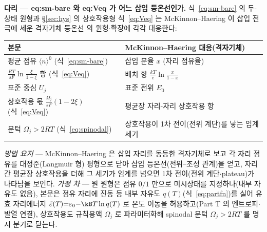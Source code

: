 
\begin{srcbox}
\textbf{다리 --- eq:sm-bare 와 eq:Veq 가 어느 삽입 등온선인가.} 식~\eqref{eq:sm-bare} 의 두-상태 원형과
\S\ref{sec:hys} 의 상호작용형 식~\eqref{eq:Veq} 는 McKinnon--Haering 이 삽입 전극에 세운 격자기체
등온선\cite{mckinnon1983} 의 원형$\cdot$확장에 각각 대응한다:
\begin{center}\footnotesize
\begin{tabular}{@{}ll@{}}
\hline
본문 & McKinnon--Haering\cite{mckinnon1983} 대응(격자기체) \\
\hline
평균 점유 $\langle n\rangle^{0}$ (식~\eqref{eq:sm-bare}) & 삽입 분율 $x$ (자리 점유율) \\
$\tfrac{RT}{sF}\ln\tfrac{\xi}{1-\xi}$ 항 (식~\eqref{eq:Veq}) & 배치 항 $\tfrac{kT}{e}\ln\tfrac{x}{1-x}$ \\
표준 중심 $U_j$ & 표준 전위 $E_0$ \\
상호작용 몫 $\tfrac{\Omega_j}{sF}(1-2\xi)$ (식~\eqref{eq:Veq}) & 평균장 자리-자리 상호작용 항 \\
문턱 $\Omega_j>2RT$ (식~\eqref{eq:spinodal}) & 상호작용이 1차 전이(전위 계단)를 낳는 임계 세기 \\
\hline
\end{tabular}
\end{center}
\emph{방법 요지} --- McKinnon--Haering 은 삽입 자리를 동등한 격자기체로 보고 각 자리 점유를 대정준(Langmuir
형) 평형으로 닫아 삽입 등온선(전위--조성 관계)을 얻고, 자리 간 평균장 상호작용을 더해 그 세기가 임계를
넘으면 1차 전이(전위 계단$\cdot$plateau)가 나타남을 보인다. \emph{가정 차} --- 원 원형은 점유 $0/1$ 만으로
미시상태를 지정하나(내부 자유도 없음), 본문은 점유 자리에 진동 등 내부 자유도 $q(T)$(식~\eqref{eq:partfn})를
실어 유효 자리에너지 $\tilde\varepsilon(T){=}\varepsilon_0{-}\kB T\ln q(T)$ 로 온도 이동을 허용하고(Part T 의
엔트로피$\cdot$발열 연결), 상호작용도 규칙용액 $\Omega_j$ 로 파라미터화해 spinodal 문턱 $\Omega_j{>}2RT$ 를
명시 분기로 닫는다.
\end{srcbox}
